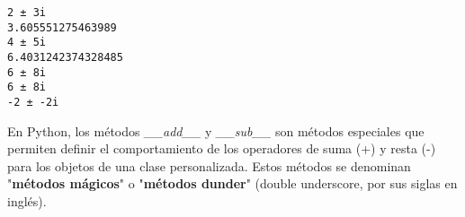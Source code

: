 \begin{exercise}
{\begin{Shaded}
\begin{Highlighting}[]
\OperatorTok{=}\NormalTok{,}\NormalTok{)}

\OperatorTok{=}\OperatorTok{+}
\OperatorTok{=}\OperatorTok{+}
\OperatorTok{=}

\OperatorTok{=}\OperatorTok{+}

\OperatorTok{=}\OperatorTok{{-}}
\end{Highlighting}
\end{Shaded}

\begin{verbatim}
2 ± 3i
3.605551275463989
4 ± 5i
6.4031242374328485
6 ± 8i
6 ± 8i
-2 ± -2i

\end{verbatim}
}\end{exercise}


En Python, los métodos \emph{\_\_add\_\_} y \emph{\_\_sub\_\_} son
métodos especiales que permiten definir el comportamiento de los
operadores de suma (+) y resta (-) para los objetos de una clase
personalizada. Estos métodos se denominan "\textbf{métodos mágicos}" o
"\textbf{métodos dunder}" (double underscore, por sus siglas en inglés).

